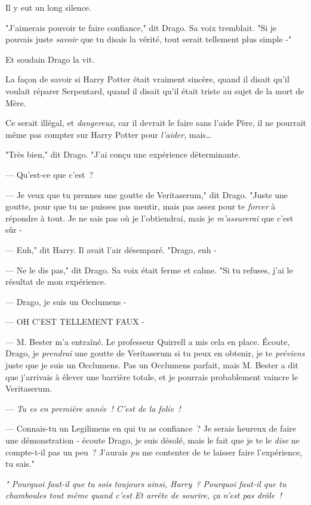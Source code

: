 Il y eut un long silence.

"J'aimerais pouvoir te faire confiance," dit Drago. Sa voix tremblait. "Si je pouvais juste \emph{savoir} que tu disais la vérité, tout serait tellement plus simple -"

Et soudain Drago la vit.

La façon de savoir si Harry Potter était vraiment sincère, quand il disait qu'il voulait réparer Serpentard, quand il disait qu'il était triste au sujet de la mort de Mère.

Ce serait illégal, et \emph{dangereux}, car il devrait le faire sans l'aide Père, il ne pourrait même pas compter sur Harry Potter pour \emph{l'aider}, mais…

"Très bien," dit Drago. "J'ai conçu une expérience déterminante.

--- Qu'est-ce que c'est~?

--- Je veux que tu prennes une goutte de Veritaserum," dit Drago. "Juste une goutte, pour que tu ne puisses pas mentir, mais pas assez pour te \emph{forcer} à répondre à tout. Je ne sais pas où je l'obtiendrai, mais je \emph{m'assurerai} que c'est sûr -

--- Euh," dit Harry. Il avait l'air désemparé. "Drago, euh -

--- Ne le dis pas," dit Drago. Sa voix était ferme et calme. "Si tu refuses, j'ai le résultat de mon expérience.

--- Drago, je suis un Occlumens -

--- OH C'EST TELLEMENT FAUX -

--- M. Bester m'a entraîné. Le professeur Quirrell a mis cela en place. Écoute, Drago, je \emph{prendrai} une goutte de Veritaserum si tu peux en obtenir, je te \emph{préviens} juste que je suis un Occlumens. Pas un Occlumens parfait, mais M. Bester a dit que j'arrivais à élever une barrière totale, et je pourrais probablement vaincre le Veritaserum.

--- \emph{Tu es en première année~! C'est de la folie~!}

--- Connais-tu un Legilimens en qui tu as confiance~? Je serais heureux de faire une démonstration - écoute Drago, je suis désolé, mais le fait que je te le \emph{dise} ne compte-t-il pas un peu~? J'aurais \emph{pu} me contenter de te laisser faire l'expérience, tu sais."

\emph{" Pourquoi faut-il que tu sois toujours ainsi, Harry~? Pourquoi faut-il que tu chamboules tout même quand c'est  Et arrête de sourire, ça n'est pas drôle~!}

